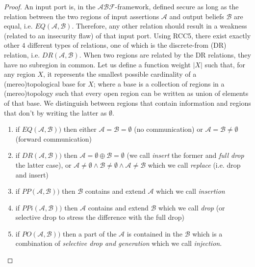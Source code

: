 \documentclass[conference]{IEEEtran}
\newcommand{\assertionRegion}{\mathcal{A}}
\newcommand{\beliefRegion}{\mathcal{B}}
\newcommand{\factRegion}{\mathcal{F}}
\newcommand{\abftheory}{\assertionRegion\beliefRegion\factRegion}
\newcommand{\eq}[2]{EQ(#1,#2)}
\newcommand{\pp}[2]{PP(#1,#2)}
\newcommand{\po}[2]{PO(#1,#2)}
\newcommand{\ppi}[2]{PPi(#1,#2)}
\newcommand{\dr}[2]{DR(#1,#2)}
\begin{document}
\begin{proof}
An input port is, in the $\abftheory$-framework, defined secure as long as the relation
	between the two regions of input assertions $\assertionRegion$ and
	output beliefs $\beliefRegion$ are equal, i.e.
	$\eq{\assertionRegion}{\beliefRegion}$. Therefore, any other relation
	should result in a weakness (related to an insecurity flaw) of that
	input port.  Using RCC5, there exist exactly other $4$ different types
	of relations, one of which is the discrete-from (DR) relation, i.e.
	$\dr{\assertionRegion}{\beliefRegion}$. When two regions are related by
	the DR relations, they have no subregion in common. Let us
	define a function weight $|X|$ such that, for any region $X$, it
	represents the smallest possible cardinality of a (mereo)topological base for
	$X$; where a base is a collection of regions in a (mereo)topology such that
	every open region can be written as union of elements of that base. 
	We distinguish between regions that contain information and regions that
	don't by writing the latter as $\emptyset$.
	\begin{enumerate}
		\item if $\eq{\assertionRegion}{\beliefRegion})$ then either
			$\assertionRegion=\beliefRegion=\emptyset$ (no
			communication) or
			$\assertionRegion=\beliefRegion\neq\emptyset$ (forward
			communication)
		\item if $\dr{\assertionRegion}{\beliefRegion})$ then
			$\assertionRegion=\emptyset\oplus\beliefRegion=\emptyset$
			(we call \emph{insert} the former and \emph{full drop}
			the latter case), or
			$\assertionRegion\neq\emptyset\wedge\beliefRegion\neq\emptyset\wedge\assertionRegion\neq\beliefRegion$
			which we call \emph{replace} (i.e. drop and insert)
		\item if $\pp{\assertionRegion}{\beliefRegion})$ then
			$\beliefRegion$ contains and extend $\assertionRegion$
			which we call \emph{insertion}
		\item if $\ppi{\assertionRegion}{\beliefRegion})$ then
			$\assertionRegion$ contains and extend $\beliefRegion$
			which we call \emph{drop} (or selective drop to stress the difference with the full drop)
		\item if $\po{\assertionRegion}{\beliefRegion})$ then a part of
			the $\assertionRegion$ is contained in the
			$\beliefRegion$ which is a combination of
			\emph{selective drop and generation} which we call \emph{injection}.
	\end{enumerate}
\end{proof}
\end{document}
